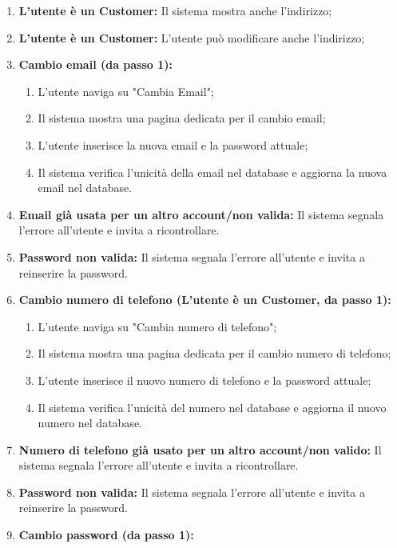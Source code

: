 \documentclass{article}
\begin{document}
	{
		\begin{enumerate}[nosep, leftmargin=25px]
			\item[\textbf{2a.}] \textbf{L'utente è un Customer:} Il sistema mostra anche l'indirizzo;
			\item[\textbf{3a.}] \textbf{L'utente è un Customer:} L'utente può modificare anche l'indirizzo; 
			\item[\textbf{1a.}] \textbf{Cambio email (da passo 1):}
			\begin{enumerate}[nosep, leftmargin=*]
				\item[i.] L'utente naviga su "Cambia Email"; 
				\item[ii.] Il sistema mostra una pagina dedicata per il cambio email;
				\item[iii.] L'utente inserisce la nuova email e la password attuale; 
				\item[iv.] Il sistema verifica l'unicità della email nel database e aggiorna la nuova email nel database.
			\end{enumerate}
			\item[\textbf{1b-e.}] \textbf{Email già usata per un altro account/non valida:} Il sistema segnala l'errore all'utente e invita a ricontrollare.
			\item[\textbf{1b-e.}] \textbf{Password non valida:} Il sistema segnala l'errore all'utente e invita a reinserire la password.
			\item[\textbf{1c.}] \textbf{Cambio numero di telefono (L'utente è un Customer, da passo 1):} 
			\begin{enumerate}[nosep, leftmargin=*]
				\item[i.] L'utente naviga su "Cambia numero di telefono";
				\item[ii.] Il sistema mostra una pagina dedicata per il cambio numero di telefono;
				\item[iii.] L'utente inserisce il nuovo numero di telefono e la password attuale;
				\item[iv.] Il sistema verifica l'unicità del numero nel database e aggiorna il nuovo numero nel database.
			\end{enumerate}
			\item[\textbf{1c-e.}] \textbf{Numero di telefono già usato per un altro account/non valido:} Il sistema segnala l'errore all'utente e invita a ricontrollare.
			\item[\textbf{1c-e.}] \textbf{Password non valida:} Il sistema segnala l'errore all'utente e invita a reinserire la password.
			\item[\textbf{1d.}] \textbf{Cambio password (da passo 1):}

\end{enumerate}}
\end{document}
